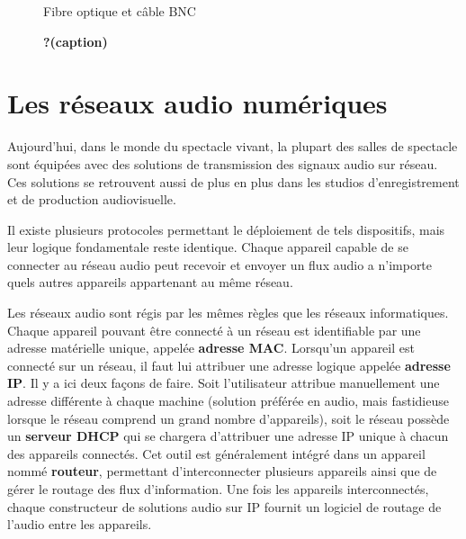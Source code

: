 \documentclass[
  letterpaper,
  DIV=11,
  numbers=noendperiod]{scrreprt}
\begin{document}
\begin{figure}
\begin{minipage}[t]{0.50\linewidth}
{{}

\caption{\label{fig-bnc}\textbf{?(caption)}}

}

\end{minipage}%
\newline
\begin{minipage}[t]{0.50\linewidth}

{\centering 

Fibre optique et câble BNC

}

\end{minipage}%

\end{figure}

\hypertarget{les-ruxe9seaux-audio-numuxe9riques}{%
\section{Les réseaux audio
numériques}\label{les-ruxe9seaux-audio-numuxe9riques}}

Aujourd'hui, dans le monde du spectacle vivant, la plupart des salles de
spectacle sont équipées avec des solutions de transmission des signaux
audio sur réseau. Ces solutions se retrouvent aussi de plus en plus dans
les studios d'enregistrement et de production audiovisuelle.

Il existe plusieurs protocoles permettant le déploiement de tels
dispositifs, mais leur logique fondamentale reste identique. Chaque
appareil capable de se connecter au réseau audio peut recevoir et
envoyer un flux audio a n'importe quels autres appareils appartenant au
même réseau.

Les réseaux audio sont régis par les mêmes règles que les réseaux
informatiques. Chaque appareil pouvant être connecté à un réseau est
identifiable par une adresse matérielle unique, appelée \textbf{adresse
MAC}. Lorsqu'un appareil est connecté sur un réseau, il faut lui
attribuer une adresse logique appelée \textbf{adresse IP}. Il y a ici
deux façons de faire. Soit l'utilisateur attribue manuellement une
adresse différente à chaque machine (solution préférée en audio, mais
fastidieuse lorsque le réseau comprend un grand nombre d'appareils),
soit le réseau possède un \textbf{serveur DHCP} qui se chargera
d'attribuer une adresse IP unique à chacun des appareils connectés. Cet
outil est généralement intégré dans un appareil nommé \textbf{routeur},
permettant d'interconnecter plusieurs appareils ainsi que de gérer le
routage des flux d'information. Une fois les appareils interconnectés,
chaque constructeur de solutions audio sur IP fournit un logiciel de
routage de l'audio entre les appareils.
\end{document}
